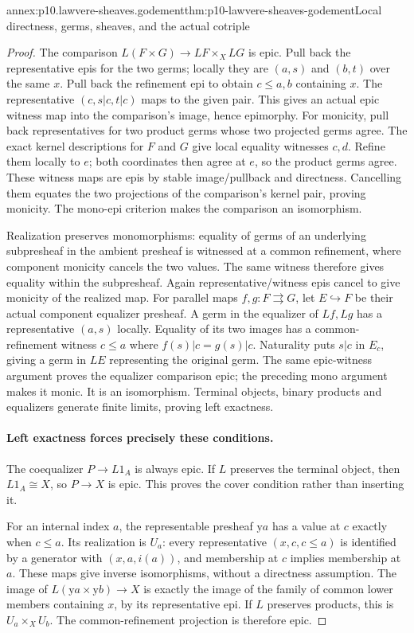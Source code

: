 \begin{annexitem}{annex:p10.lawvere-sheaves.godement}{thm:p10-lawvere-sheaves-godement}{Local directness, germs, sheaves, and the actual cotriple}
\begin{proof}
The comparison \(L(F\times G)\to LF\times_XLG\)
is epic.  Pull back the representative epis for the
two germs; locally they are \((a,s)\) and \((b,t)\)
over the same \(x\).  Pull back the refinement epi
to obtain \(c\leq a,b\) containing \(x\).  The
representative \((c,s|c,t|c)\) maps to the given
pair.  This gives an actual epic witness map into
the comparison's image, hence epimorphy.
For monicity, pull back representatives for two
product germs whose two projected germs agree.
The exact kernel descriptions for \(F\) and \(G\)
give local equality witnesses \(c,d\).  Refine them
locally to \(e\); both coordinates then agree at
\(e\), so the product germs agree.  These witness
maps are epis by stable image/pullback and directness.
Cancelling them equates the two projections of the
comparison's kernel pair, proving monicity.  The
mono-epi criterion makes the comparison an isomorphism.

Realization preserves monomorphisms: equality of
germs of an underlying subpresheaf in the ambient
presheaf is witnessed at a common refinement, where
component monicity cancels the two values.  The same
witness therefore gives equality within the subpresheaf.
Again representative/witness epis cancel to give
monicity of the realized map.
For parallel maps \(f,g:F\rightrightarrows G\), let
\(E\hookrightarrow F\) be their actual component
equalizer presheaf.  A germ in the equalizer of
\(Lf,Lg\) has a representative \((a,s)\) locally.
Equality of its two images has a common-refinement
witness \(c\leq a\) where
\(f(s)|c=g(s)|c\).  Naturality puts \(s|c\) in
\(E_c\), giving a germ in \(LE\) representing the
original germ.  The same epic-witness argument proves
the equalizer comparison epic; the preceding mono
argument makes it monic.  It is an isomorphism.
Terminal objects, binary products and equalizers
generate finite limits, proving left exactness.

\paragraph{Left exactness forces precisely these conditions.}
The coequalizer \(P\to L1_A\) is always epic.
If \(L\) preserves the terminal object, then
\(L1_A\cong X\), so \(P\to X\) is epic.  This
proves the cover condition rather than inserting it.

For an internal index \(a\), the representable
presheaf \(\mathrm ya\) has a value at \(c\)
exactly when \(c\leq a\).  Its realization is
\(U_a\): every representative \((x,c,c\leq a)\)
is identified by a generator with \((x,a,i(a))\),
and membership at \(c\) implies membership at
\(a\).  These maps give inverse isomorphisms,
without a directness assumption.  The image of
\(L(\mathrm ya\times\mathrm yb)\to X\) is
exactly the image of the family of common lower
members containing \(x\), by its representative epi.
If \(L\) preserves products, this is
\(U_a\times_XU_b\).  The common-refinement
projection is therefore epic.


\end{proof}
\end{annexitem}
